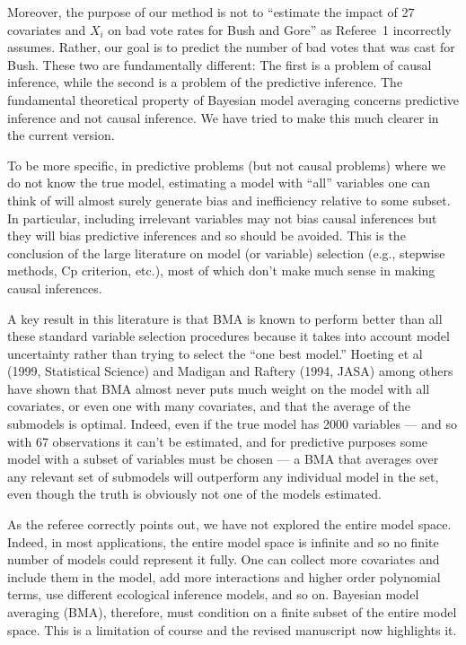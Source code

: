 \documentclass[11pt]{article}
\begin{document}
\begin{enumerate}
  Moreover, the purpose of our method is not to ``estimate the impact
  of 27 covariates and $X_i$ on bad vote rates for Bush and Gore'' as
  Referee~1 incorrectly assumes. Rather, our goal is to predict the
  number of bad votes that was cast for Bush.  These two are
  fundamentally different: The first is a problem of causal inference,
  while the second is a problem of the predictive inference. The
  fundamental theoretical property of Bayesian model averaging
  concerns predictive inference and not causal inference.  We have
  tried to make this much clearer in the current version.
  
  To be more specific, in predictive problems (but not causal
  problems) where we do not know the true model, estimating a model
  with ``all'' variables one can think of will almost surely generate
  bias and inefficiency relative to some subset.  In particular,
  including irrelevant variables may not bias causal inferences but
  they will bias predictive inferences and so should be avoided.  This
  is the conclusion of the large literature on model (or variable)
  selection (e.g., stepwise methods, Cp criterion, etc.), most of
  which don't make much sense in making causal inferences.
  
  A key result in this literature is that BMA is known to perform
  better than all these standard variable selection procedures because
  it takes into account model uncertainty rather than trying to select
  the ``one best model.''  Hoeting et al (1999, Statistical Science)
  and Madigan and Raftery (1994, JASA) among others have shown that
  BMA almost never puts much weight on the model with all covariates,
  or even one with many covariates, and that the average of the
  submodels is optimal.  Indeed, even if the true model has 2000
  variables --- and so with 67 observations it can't be estimated, and
  for predictive purposes some model with a subset of variables must
  be chosen --- a BMA that averages over any relevant set of submodels
  will outperform any individual model in the set, even though the
  truth is obviously not one of the models estimated.
  
  As the referee correctly points out, we have not explored the entire
  model space. Indeed, in most applications, the entire model space is
  infinite and so no finite number of models could represent it fully.
  One can collect more covariates and include them in the model, add
  more interactions and higher order polynomial terms, use different
  ecological inference models, and so on.  Bayesian model averaging
  (BMA), therefore, must condition on a finite subset of the entire
  model space.  This is a limitation of course and the revised
  manuscript now highlights it.
  

\end{enumerate}
\end{document}
